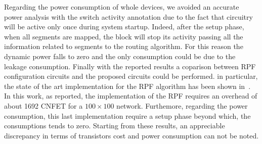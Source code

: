Regarding the power consumption of whole \disr{} devices, 
we avoided an accurate power analysis with the switch activity
annotation due to the fact that \disr{} circuitry will be active 
only once during system startup. Indeed, after the setup phase, 
when all segments are mapped, the \disr{} block will stop its activity 
passing all the information related to segments to the routing
algorithm. For this reason the dynamic power falls to zero and
the only consumption could be due to the leakage
consumption. Finally with the reported results a coparison between 
RPF configuration circuits and the proposed circuits could be performed.
in particular, the state of the art implementation for the RPF algorithm has been shown in~\cite{patwardhan_nanoarch06}. In this work, as reported,  the implementation of the RPF requires an overhead of about 1692 CNFET for a $100 \times 100$ network. Furthemore, regarding the power consumption, this last implementation require a setup phase beyond which, the consumptions tends to zero. Starting from these results, an appreciable discrepancy in terms of transistors cost and power consumption can not be noted.
